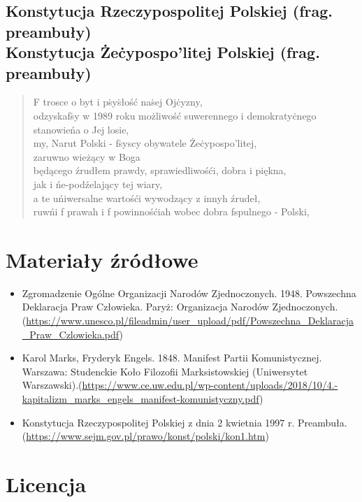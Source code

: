 \documentclass[polish,12pt]{article}
\begin{document}
\subsection{Konstytucja Rzeczypospolitej Polskiej (frag. preambuły)\texorpdfstring{\\}{} Konstytucja Że\.cypospo'litej Polskiej (frag. preambuły)}
\begin{quote}
    \begin{center}
        F trosce o byt i p\.sy\.słość na\.sej Oj\.cyzny, \\
        odzyskaf\.sy w 1989 roku możliwość suwerennego i demokraty\.cnego stanowieńa o Jej losie, \\
        my, Narut Polski - f\.syscy obywatele Że\.cypospo'litej, \\
        zaruwno wieżący w Boga \\
        będącego źrudłem prawdy, sprawiedliwośći, dobra i piękna, \\
        jak i ńe-podźelający tej wiary, \\
        a te uńiwersalne wartośći wywodzący z innyh źrudeł, \\
        ruwńi f prawah i f powinnośćiah wobec dobra fspulnego - Polski, \newline
        [...]
    \end{center}
\end{quote}
\newpage
\section{Materiały źródłowe}
\begin{itemize}
    \item Zgromadzenie Ogólne Organizacji Narodów Zjednoczonych. 1948. Powszechna Deklaracja Praw Człowieka. Paryż: Organizacja Narodów Zjednoczonych.\newline (\url{https://www.unesco.pl/fileadmin/user_upload/pdf/Powszechna_Deklaracja_Praw_Czlowieka.pdf})
    \item Karol Marks, Fryderyk Engels. 1848. Manifest Partii Komunistycznej. Warszawa: Studenckie Koło Filozofii Marksistowskiej (Uniwersytet Warszawski).\newline (\url{https://www.ce.uw.edu.pl/wp-content/uploads/2018/10/4.-kapitalizm_marks_engels_manifest-komunistyczny.pdf})
    \item Konstytucja Rzeczypospolitej Polskiej z dnia 2 kwietnia 1997 r. Preambuła.\newline (\url{https://www.sejm.gov.pl/prawo/konst/polski/kon1.htm})
\end{itemize}
\section{Licencja}
\doclicenseThis
\end{document}

